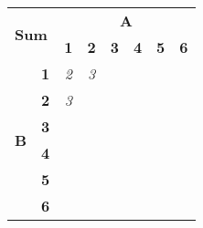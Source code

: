 \documentclass[convert]{standalone}
\begin{document}
    
\begin{tabular}{|cc|cccccc|}
\hline
\multicolumn{2}{|l|}{\multirow{2}{*}{\textbf{Sum}}}           & \multicolumn{6}{c|}{\textbf{A}}                                                                                                                                                      \\ \cline{3-8} 
\multicolumn{2}{|l|}{}                                         & \multicolumn{1}{c|}{\textbf{1}} & \multicolumn{1}{c|}{\textbf{2}} & \multicolumn{1}{c|}{\textbf{3}} & \multicolumn{1}{c|}{\textbf{4}} & \multicolumn{1}{c|}{\textbf{5}} & \textbf{6} \\ \hline
\multicolumn{1}{|c|}{\multirow{6}{*}{\textbf{B}}} & \textbf{1} & \multicolumn{1}{c|}{\textit{2}} & \multicolumn{1}{c|}{\textit{3}} & \multicolumn{1}{c|}{}           & \multicolumn{1}{c|}{}           & \multicolumn{1}{c|}{}           &            \\ \cline{2-8} 
\multicolumn{1}{|c|}{}                            & \textbf{2} & \multicolumn{1}{c|}{\textit{3}} & \multicolumn{1}{c|}{}           & \multicolumn{1}{c|}{}           & \multicolumn{1}{c|}{}           & \multicolumn{1}{c|}{}           &            \\ \cline{2-8} 
\multicolumn{1}{|c|}{}                            & \textbf{3} & \multicolumn{1}{c|}{}           & \multicolumn{1}{c|}{}           & \multicolumn{1}{c|}{}           & \multicolumn{1}{c|}{}           & \multicolumn{1}{c|}{}           &            \\ \cline{2-8} 
\multicolumn{1}{|c|}{}                            & \textbf{4} & \multicolumn{1}{c|}{}           & \multicolumn{1}{c|}{}           & \multicolumn{1}{c|}{}           & \multicolumn{1}{c|}{}           & \multicolumn{1}{c|}{}           &            \\ \cline{2-8} 
\multicolumn{1}{|c|}{}                            & \textbf{5} & \multicolumn{1}{c|}{}           & \multicolumn{1}{c|}{}           & \multicolumn{1}{c|}{}           & \multicolumn{1}{c|}{}           & \multicolumn{1}{c|}{}           &            \\ \cline{2-8} 
\multicolumn{1}{|c|}{}                            & \textbf{6} & \multicolumn{1}{c|}{}           & \multicolumn{1}{c|}{}           & \multicolumn{1}{c|}{}           & \multicolumn{1}{c|}{}           & \multicolumn{1}{c|}{}           &            \\ \hline
\end{tabular}
\end{document}
